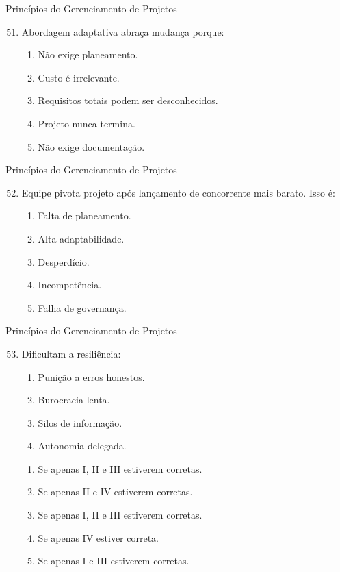 \documentclass{beamer}
\begin{document}
\begin{frame}{Princípios do Gerenciamento de Projetos}
	\begin{enumerate}
		\setcounter{enumi}{50}
		\justifying
		\item Abordagem adaptativa abraça mudança porque:
		\begin{enumerate}[a]
			\item Não exige planeamento.
			\item Custo é irrelevante.
			\item \alert<2>{Requisitos totais podem ser desconhecidos.}
			\item Projeto nunca termina.
			\item Não exige documentação.
		\end{enumerate}
	\end{enumerate}
\end{frame}

\begin{frame}{Princípios do Gerenciamento de Projetos}
	\begin{enumerate}
		\setcounter{enumi}{51}
		\justifying
		\item Equipe pivota projeto após lançamento de concorrente mais barato. Isso é:
		\begin{enumerate}[a]
			\item Falta de planeamento.
			\item \alert<2>{Alta adaptabilidade.}
			\item Desperdício.
			\item Incompetência.
			\item Falha de governança.
		\end{enumerate}
	\end{enumerate}
\end{frame}

\begin{frame}{Princípios do Gerenciamento de Projetos}
	\begin{enumerate}
		\setcounter{enumi}{52}
		\justifying
		\item Dificultam a resiliência:
		\begin{enumerate}[I]
			\item Punição a erros honestos.
			\item Burocracia lenta.
			\item Silos de informação.
			\item Autonomia delegada.
		\end{enumerate}
		\begin{enumerate}[a]
			\item Se apenas I, II e III estiverem corretas.
			\item Se apenas II e IV estiverem corretas.
			\item \alert<2>{Se apenas I, II e III estiverem corretas.}
			\item Se apenas IV estiver correta.
			\item Se apenas I e III estiverem corretas.
		\end{enumerate}
	\end{enumerate}
\end{frame}
\end{document}
